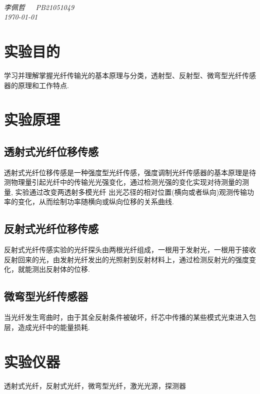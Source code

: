 \documentclass[a4paper]{article}%
\title{\heiti{实验报告}}%
\author{{\emph{李佩哲}}}
\date{\emph{\small\today}}
\begin{document}
\begin{center}
\\
\emph{李佩哲~~~PB21051049~~~\\\today}
\end{center}

\section{实验目的}
学习并理解掌握光纤传输光的基本原理与分类，透射型、反射型、微弯型光纤传感器的原理和工作特点.

\section{实验原理}
\subsection{透射式光纤位移传感}
透射式光纤位移传感是一种强度型光纤传感，强度调制光纤传感器的基本原理是待测物理量引起光纤中的传输光光强变化，通过检测光强的变化实现对待测量的测量,
实验通过改变两透射多模光纤 出光芯径的相对位置(横向或者纵向)观测传输功率的变化，从而绘制功率随横向或纵向位移的关系曲线.

\subsection{反射式光纤位移传感}
反射式光纤传感实验的光纤探头由两根光纤组成，一根用于发射光，一根用于接收反射回来的光，由发射光纤发出的光照射到反射材料上，通过检测反射光的强度变化，就能测出反射体的位移.


\subsection{微弯型光纤传感器}
当光纤发生弯曲时，由于其全反射条件被破坏，纤芯中传播的某些模式光束进入包层，造成光纤中的能量损耗.

\section{实验仪器}
透射式光纤，反射式光纤，微弯型光纤，激光光源，探测器
\end{document}
